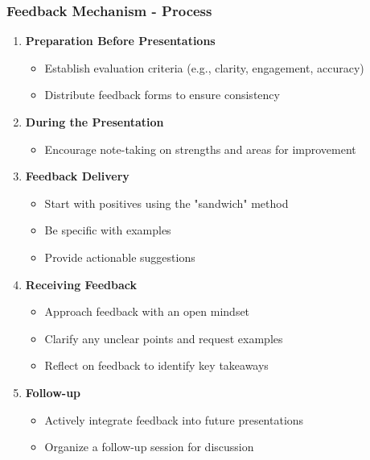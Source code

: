 \documentclass[aspectratio=169]{beamer}
\begin{document}
\begin{frame}[fragile]
    \frametitle{Feedback Mechanism - Process}
    \begin{enumerate}
        \item \textbf{Preparation Before Presentations}
        \begin{itemize}
            \item Establish evaluation criteria (e.g., clarity, engagement, accuracy)
            \item Distribute feedback forms to ensure consistency
        \end{itemize}

        \item \textbf{During the Presentation}
        \begin{itemize}
            \item Encourage note-taking on strengths and areas for improvement
        \end{itemize}

        \item \textbf{Feedback Delivery}
        \begin{itemize}
            \item Start with positives using the "sandwich" method
            \item Be specific with examples
            \item Provide actionable suggestions
        \end{itemize}

        \item \textbf{Receiving Feedback}
        \begin{itemize}
            \item Approach feedback with an open mindset
            \item Clarify any unclear points and request examples
            \item Reflect on feedback to identify key takeaways
        \end{itemize}

        \item \textbf{Follow-up}
        \begin{itemize}
            \item Actively integrate feedback into future presentations
            \item Organize a follow-up session for discussion
        \end{itemize}
    \end{enumerate}
\end{frame}
\end{document}
